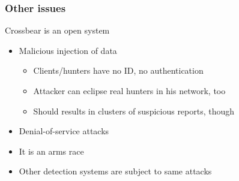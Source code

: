 \begin{frame}
  \frametitle{Other issues}
  \begin{block}{Crossbear is an open system}
    \begin{itemize}
    \item Malicious injection of data
      \begin{itemize}
      \item Clients/hunters have no ID, no authentication
      \item Attacker can eclipse real hunters in his network, too
      \item Should results in clusters of suspicious reports, though
      \end{itemize}
    \item Denial-of-service attacks
    \item It is an arms race
    \item Other detection systems are subject to same attacks
    \end{itemize}
  \end{block}
\end{frame}

